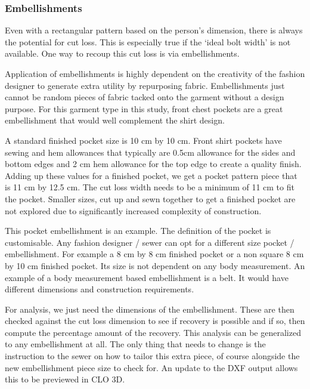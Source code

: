 
\subsubsection{Embellishments}
Even with a rectangular pattern based on the person's dimension, there is always the potential for cut loss. This is especially true if the `ideal bolt width' is not available. One way to recoup this cut loss is via embellishments.

Application of embellishments is highly dependent on the creativity of the fashion designer to generate extra utility by repurposing fabric. Embellishments just cannot be random pieces of fabric tacked onto the garment without a design purpose. For this garment type in this study, front chest pockets are a great embellishment that would well complement the shirt design. 

A standard finished pocket size is 10 cm by 10 cm. Front shirt pockets have sewing and hem allowances that typically are 0.5cm allowance for the sides and bottom edges and 2 cm hem allowance for the top edge to create a quality finish. Adding up these values for a finished pocket, we get a pocket pattern piece that is 11 cm by 12.5 cm. The cut loss width needs to be a minimum of 11 cm to fit the pocket. Smaller sizes, cut up and sewn together to get a finished pocket are not explored due to significantly increased complexity of construction.

This pocket embellishment is an example. The definition of the pocket is customisable. Any fashion designer / sewer can opt for a different size pocket / embellishment. For example a 8 cm by 8 cm finished pocket or a non square 8 cm by 10 cm finished pocket. Its size is not dependent on any body measurement. An example of a body measurement based embellishment is a belt. It would have different dimensions and construction requirements.

For analysis, we just need the dimensions of the embellishment. These are then checked against the cut loss dimension to see if recovery is possible and if so, then compute the percentage amount of the recovery. This analysis can be generalized to any embellishment at all. The only thing that needs to change is the instruction to the sewer on how to tailor this extra piece, of course alongside the new embellishment piece size to check for. An update to the DXF output allows this to be previewed in CLO 3D.


